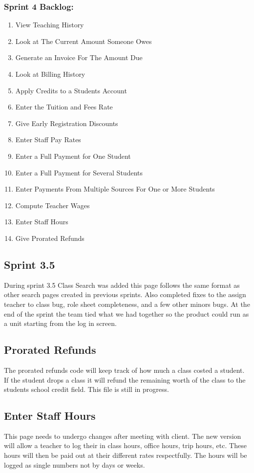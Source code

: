 \subsubsection{Sprint 4 Backlog:}

\begin{enumerate}
\item View Teaching History
\item Look at The Current Amount Someone Owes
\item Generate an Invoice For The Amount Due
\item Look at Billing History
\item Apply Credits to a Students Account
\item Enter the Tuition and Fees Rate
\item Give Early Registration Discounts
\item Enter Staff Pay Rates
\item Enter a Full Payment for One Student 
\item Enter a Full Payment for Several Students
\item Enter Payments From Multiple Sources For One or More Students
\item Compute Teacher Wages 
\item Enter Staff Hours
\item Give Prorated Refunds 
\end{enumerate}

\subsection{Sprint 3.5}
During sprint 3.5 Class Search was added this page follows the same format as other search pages created in previous sprints. Also completed fixes to the assign teacher to class bug, role sheet completeness, and a few other minors bugs. At the end of the sprint the team tied what we had together so the product could run as a unit starting from the log in screen.

\subsection{Prorated Refunds}
The prorated refunds code will keep track of how much a class costed a student. If the student drops a class it will refund the remaining worth of the class to the students school credit field. This file is still in progress.

\subsection{Enter Staff Hours}
This page needs to undergo changes after meeting with client. The new version will allow a teacher to log their in class hours, office hours, trip hours, etc. These hours will then be paid out at their different rates respectfully. The hours will be logged as single numbers not by days or weeks.

